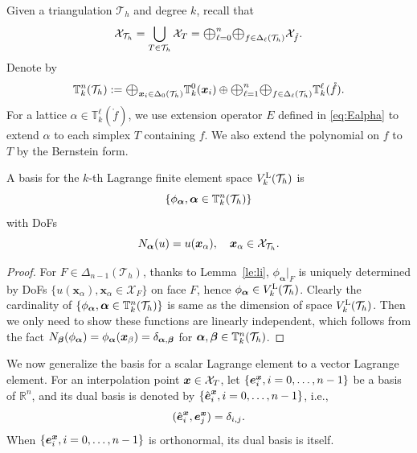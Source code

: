 \documentclass[mathpazo]{cicp}
\newcommand{\Oplus}{\ensuremath{\vcenter{\hbox{\scalebox{1.5}{$\oplus$}}}}}
\begin{document}
Given a triangulation $\mathcal T_h$ and
degree $k$, recall that
$$
\mathcal X_{\mathcal T_h} = \bigcup_{T\in\mathcal T_h} \mathcal X_T = \Oplus_{\ell = 0}^n \Oplus_{f\in \Delta_{\ell}(\mathcal T_h)} \mathcal X_{\mathring{f}}.
$$
Denote by
$$
\mathbb T_k^n(\mathcal T_h) := \Oplus_{\bs x_i\in \Delta_0(\mathcal T_h)}\mathbb T_k^{0}(\bs x_i) \oplus \Oplus_{\ell = 1}^n \Oplus_{f\in \Delta_{\ell}(\mathcal T_h)} \mathbb T_k^{\ell}(\mathring{f}).
$$
For a lattice $\alpha \in \mathbb T_k^{\ell}(\mathring{f})$, we use extension operator $E$ defined in \eqref{eq:Ealpha} to extend $\alpha$ to each simplex $T$ containing $f$. We also extend the polynomial on $f$ to $T$ by the Bernstein form.

\begin{theorem}
A basis for the $k$-th Lagrange finite element space $V_k^{\rm L}(\mathcal T_h)$ 
is 
$$\{\phi_{\boldsymbol \alpha}, \boldsymbol \alpha\in  \mathbb T^{n}_k(\mathcal T_h)\}$$ with DoFs
$$
N_{\boldsymbol \alpha} (u) = u(\boldsymbol x_{\alpha}), \quad \boldsymbol x_{\alpha} \in \mathcal X_{\mathcal T_h}.
$$
\end{theorem}
\begin{proof}
For $F\in \Delta_{n-1}(\mathcal T_h)$, thanks to Lemma~\ref{le:li}, $\phi_{\boldsymbol \alpha}|_F$ is uniquely determined by DoFs $\{u(\boldsymbol x_{\alpha}), \boldsymbol x_{\alpha} \in \mathcal X_{F}\}$ on face $F$, hence $\phi_{\boldsymbol \alpha}\in V_k^{\rm L}(\mathcal T_h)$. Clearly the cardinality of $\{\phi_{\boldsymbol \alpha}, \boldsymbol \alpha\in  \mathbb T^{n}_k(\mathcal T_h)\}$ is same as the dimension of space $V_k^{\rm L}(\mathcal T_h)$. Then we only need to show these functions are linearly independent,  which follows from the fact $N_{\boldsymbol \beta}(\phi_{\boldsymbol \alpha}) = \phi_{\boldsymbol \alpha}(\boldsymbol x_{\beta}) = \delta_{\boldsymbol \alpha,\boldsymbol \beta}$ for $\boldsymbol \alpha, \boldsymbol \beta\in\mathbb T^{n}_k(\mathcal T_h)$.
\end{proof}

We now generalize the basis for a scalar Lagrange element to a vector Lagrange element.
For an interpolation point $\boldsymbol x\in \mathcal X_{T}$, let $\{\boldsymbol e_i^{\boldsymbol x}, i=0,\ldots, n-1\}$ be a basis of $\mathbb R^n$, and its dual basis is denoted by $\{\hat{\boldsymbol e}_i^{\boldsymbol x}, i=0,\ldots, n-1\}$, i.e.,
$$
(\hat{\boldsymbol e}_i^{\boldsymbol x}, \boldsymbol e_j^{\boldsymbol x}) = \delta_{i,j}.
$$
When $\{\boldsymbol e_i^{\boldsymbol x}, i=0,\ldots, n-1\}$ is orthonormal, its dual basis is itself. 
\end{document}
